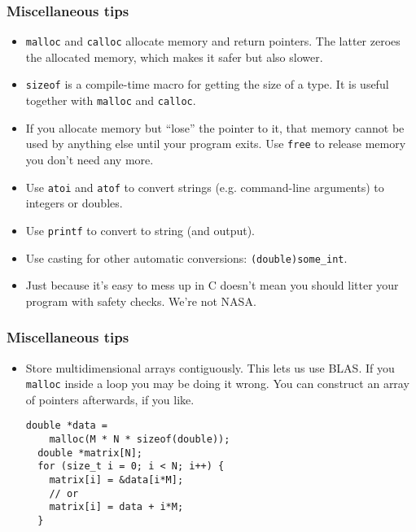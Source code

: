 \begin{frame}
  \frametitle{Miscellaneous tips}
  \begin{itemize}
  \item \texttt{malloc} and \texttt{calloc} allocate memory and return pointers.
    The latter zeroes the allocated memory, which makes it safer but also
    slower.
  \item \texttt{sizeof} is a compile-time macro for getting the size of a type.
    It is useful together with \texttt{malloc} and \texttt{calloc}.
  \item If you allocate memory but ``lose'' the pointer to it, that memory
    cannot be used by anything else until your program exits. Use \texttt{free}
    to release memory you don't need any more.
  \item Use \texttt{atoi} and \texttt{atof} to convert strings (e.g.
    command-line arguments) to integers or doubles.
  \item Use \texttt{printf} to convert to string (and output).
  \item Use casting for other automatic conversions: \texttt{(double)some\_int}.
  \item Just because it's easy to mess up in C doesn't mean you should litter
    your program with safety checks. We're not NASA.
  \end{itemize}
\end{frame}

\begin{frame}[fragile]
  \frametitle{Miscellaneous tips}
  \begin{itemize}
  \item Store multidimensional arrays contiguously. This lets us use BLAS. If
    you \texttt{malloc} inside a loop you may be doing it wrong. You can
    construct an array of pointers afterwards, if you like.
\begin{lstlisting}[style=c]
  double *data =
    malloc(M * N * sizeof(double));
  double *matrix[N];
  for (size_t i = 0; i < N; i++) {
    matrix[i] = &data[i*M];
    // or
    matrix[i] = data + i*M;
  }
\end{lstlisting}
  \end{itemize}
\end{frame}


